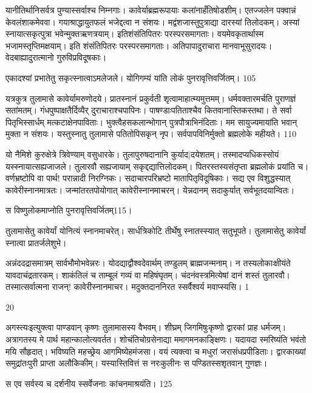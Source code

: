 यानीतिर्थानिसर्वत्र पुण्यास्सर्वाश्च निम्नगाः।
कावेर्याब्रह्मरूपायाः कलांनाहँतिषोडशीम्।
एतज्जलेन पक्वान्नं केवलंशाकमेववा।
गयाश्राद्धायुतफलं भजेद्दत्वा न संशयः।
मद्वंशजास्तुपुत्राद्या दारस्यां तिलोदकम्।
अस्यां स्नायात्सकृत्पुत्रा भवेन्मुक्तऋणत्रयाम्।
इतिशंसंतिपितरः परस्परसमागताः।
वयमेवकृतार्थास्म भजामस्तृप्तिमक्षयाम्।
इति शंसंतिपितरः परस्परसमागताः।
अतिपापादुराचारा मानवाभूसुरादयः।
वेदबाह्यादुरात्मानो गुरुविप्रविदूषकाः।

एकादश्यां प्रभातेतु सकृत्स्नात्वाऽमलेजले।
योगिगम्यं यांति लोकं पुनरावृत्तिवर्जितम्।
105

यत्रकुत्र तुलामासे कावेर्यामरुणोदये।
प्रातस्नानं प्रकुर्वती शृत्वामाहात्म्यमुत्तमम्।
धर्मवक्तारमर्चति पुराणज्ञं सतांमतम्।
गंधपुष्पाक्षतैर्दिव्यैर् दुराचाराश्चपापिनः।
पाषण्डाःपतिताश्चैव कितवानास्तिकस्तथा।
ते सर्वा पितृभिस्सार्धम् मत्कटाक्षेनपाविताः।
भुक्त्वैहसकलान्भोगान् पुत्रपौत्राभिनंदिताः।
मम सायुज्यमायांति भवान् मुक्ता न संशयः।
यस्तुस्नातु तुलामासे पतितोपिसकृन् नृप।
सर्वपापविनिर्मुक्तो ब्रह्मलोके महीयते।
110

यो नैमिशे कुरुक्षेत्रे त्रिवेण्याम् वसुधारके।
तुलापुरुषदानानि कुर्याद|दयेशतम्।
तस्मादप्यधिकस्सोयं यस्स्नायात्सह्यजाजले।
तुलारवौ सह्यजायाम् सकृद्दद्यात्तिलोदकम्।
पितरस्तस्यसंतृप्ता ब्रह्मलोकं प्रयांति च।
वर्णभ्रष्टोपि वा पार्थ! परान्नादी निरग्निकः।
सदाचारपरिभ्रष्टो मातापितृविदूषिकाः।
सद्य एव विशुद्धस्यात् कावेरीस्नानमात्रतः।
जन्मांतरतपोयोगात् कावेरीस्नानमाचरन्।
येन्नदानम् सदाकुर्यात् सर्वभूतदयान्वितः।

स विष्णुलोकमाप्नोति पुनरावृत्तिवर्जितम्115।


तुलामासेतु कावेर्यां योनित्यं स्नानमाचरेत्।
सार्धत्रिकोटि तीर्थेषु स्नातस्स्यात् सतुभूपते।
तुलामासेतु कावेर्यां स्नात्वा प्रातर्जलेशुभे।

अन्नंददद्रासमात्रम् सार्वभौमोभवेन्नरः।
योदद्याद्वौश्वदेवार्थम् तण्डुलम् ब्राह्मजन्मनाम्।
न तस्यलोकाःक्षीयंते यावदाचंद्रतारकम्।
शाकंतिलं च ताम्बूलं गव्यं वा महिषंघृतम्।
चंदनंवस्त्रमित्येषां दानं शस्तं तुलारवौ।
तस्मात्सर्वात्मना राजन्! कावेरीस्नानमाचर।
मदुक्तदाननिरत स्सर्वैश्वर्य मवाप्स्यसि।
1

20

अगस्त्यःइत्युक्त्वा पाण्डवान् कृष्णः तुलामासस्य वैभवम्।
शीघ्रम् जिगमिषुःकृष्णो द्वारकां प्राह धर्मजम्।
अत्रागतस्य मे पार्थ महान्कालोत्यवर्तत।
शोचंतिचोग्रसेनाद्या ममागमनकाङ्क्षिणः।
यदायदा स्मरिष्यंति भवंतो मयि सौहृदात्।
भविष्यति महच्छ्रेय आगमिष्येहमंजसा।
वयं त्यक्त्वा च मधुरां जरासंधप्रपीडिताः।
द्वारकाख्यां समुद्रांतःपुरी प्राप्ता अलौकिकीम्।
यस्यास्तिवित्तं स नरःकुलीनः
स पण्डितस्सशृतवान् गुणज्ञः।

स एव सर्वस्य च दर्शनीय
स्सर्वेजनाः कांचनमाश्रयंति।
125

